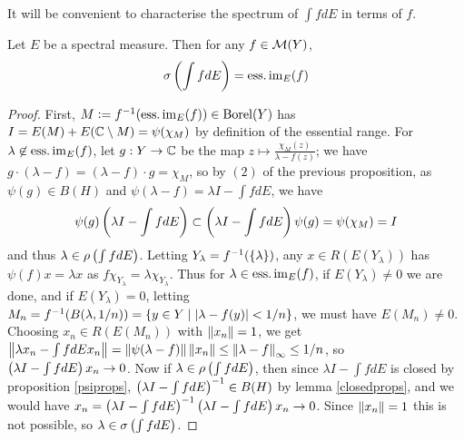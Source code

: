 \documentclass[10pt]{amsart}
\begin{document}
It will be convenient to characterise the spectrum of $\int f dE$ in terms of $f$. %
\begin{proposition}\label{essimspec} %
    Let $E$ be a spectral measure. Then for any $f \in \mathcal{M}(Y)$,
    $$
        \sigma\left(  \int f dE  \right) = \operatorname{ess.im}_E(f)
    $$
\end{proposition}
\begin{proof}
    First, $M \vcentcolon= f^{-1}(\operatorname{ess.im}_E(f)) \in \operatorname{Borel}(Y)$ has $I = E(M) + E(\mathbb{C} \setminus M) = \psi(\chi_M)$ by definition of the essential range. For $\lambda \not\in \operatorname{ess.im}_E(f)$, let $g : Y \to \mathbb{C}$ be the map $z \mapsto \frac{\chi_M(z)}{\lambda - f(z)}$; we have $g \cdot (\lambda - f) = (\lambda - f) \cdot g = \chi_M$, so by $(2)$ of the previous proposition, as $\psi(g) \in B(H)$ and $\psi(\lambda - f) = \lambda I - \int f dE$, we have
    $$
        \psi(g)\left(  \lambda I - \int f dE  \right) \subset \left(  \lambda I - \int f dE  \right)\psi(g) = \psi(\chi_M) = I
    $$ %
    and thus $\lambda \in \rho\left(  \int f dE  \right)$. Letting $Y_\lambda = f^{-1}(\left\{  \lambda  \right\})$, any $x \in R(E(Y_\lambda))$ has $\psi(f)x = \lambda x$ as $f\chi_{Y_\lambda} = \lambda\chi_{Y_\lambda}$. Thus for $\lambda \in \operatorname{ess.im}_E(f)$, if $E(Y_\lambda) \neq 0$ we are done, and if $E(Y_\lambda) = 0$, letting $M_n = f^{-1}(B(\lambda, 1/n)) = \left\{  y \in Y \mid \left| \lambda - f(y) \right| < 1/n  \right\}$, we must have $E(M_n) \neq 0$. Choosing $x_n \in R(E(M_n))$ with $\left\| x_n \right\| = 1$, we get $\left\| \lambda x_n - \int f dE x_n \right\| = \left\| \psi(\lambda - f) \right\|\left\| x_n \right\| \leq \left\| \lambda - f \right\|_\infty \leq 1/n$, so $\left(  \lambda I - \int f dE  \right)x_n \to 0$. Now if $\lambda \in \rho\left(  \int f dE  \right)$, then since $\lambda I - \int f dE$ is closed by proposition \ref{psiprops}, $\left(  \lambda I - \int f dE  \right)^{-1} \in B(H)$ by lemma \ref{closedprops}, and we would have $x_n = \left(  \lambda I - \int f dE  \right)^{-1}\left(  \lambda I - \int f dE  \right)x_n \to 0$. Since $\left\| x_n \right\| = 1$ this is not possible, so $\lambda \in \sigma\left(  \int f dE  \right)$.
\end{proof}
\end{document}
